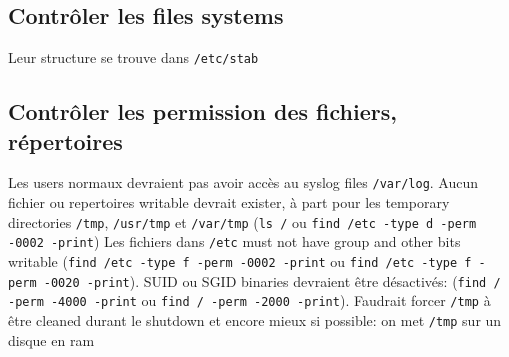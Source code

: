 \subsection{Contrôler les files systems}
Leur structure se trouve dans \verb!/etc/stab!

\subsection{Contrôler les permission des fichiers, répertoires}
Les users normaux devraient pas avoir accès au syslog files \verb!/var/log!. Aucun fichier ou repertoires writable devrait exister, à part pour les temporary directories \verb!/tmp!, \verb!/usr/tmp! et \verb!/var/tmp! (\verb!ls /! ou \verb!find /etc -type d -perm -0002 -print!) 
Les fichiers dans \verb!/etc! must not have group and other bits writable (\verb!find /etc -type f -perm -0002 -print! ou \verb!find /etc -type f -perm -0020 -print!). SUID ou SGID binaries devraient être désactivés: (\verb!find / -perm -4000 -print! ou \verb!find / -perm -2000 -print!). Faudrait forcer \verb!/tmp! à être cleaned durant le shutdown et encore mieux si possible: on met \verb!/tmp! sur un disque en ram

